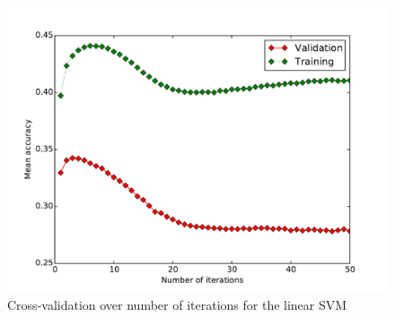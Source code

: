 \documentclass{acm_proc_article-sp}
\begin{document}
\begin{figure}[h!]
	\centering
	\includegraphics[width=\linewidth]{SVM_standard_iter}
	\caption{Cross-validation over number of iterations for the linear SVM}
	\label{fig:svm-iter}
\end{figure}
\end{document}
